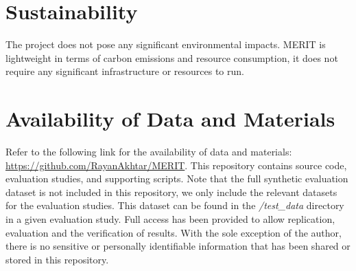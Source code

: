 \section{Sustainability}

The project does not pose any significant environmental impacts.
MERIT is lightweight in terms of carbon emissions and resource consumption, 
it does not require any significant infrastructure or resources to run.


\section{Availability of Data and Materials}
Refer to the following link for the availability of data and materials: \url{https://github.com/RayanAkhtar/MERIT}.
This repository contains source code, evaluation studies, and supporting scripts.
Note that the full synthetic evaluation dataset is not included in this repository, we only include the relevant
datasets for the evaluation studies. This dataset can be found in the \textit{/test\_data} directory in a given evaluation study.
Full access has been provided to allow replication, evaluation and the verification of results.
With the sole exception of the author, there is no sensitive or personally identifiable information that has been shared or stored in this 
repository.
